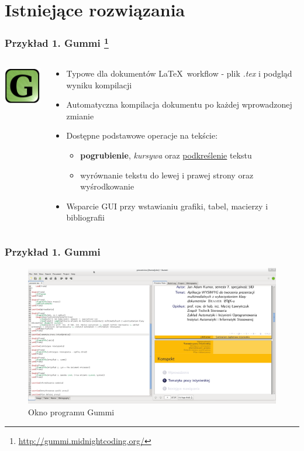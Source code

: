 \documentclass[t]{beamer}
\begin{document}
\section{Istniejące rozwiązania}

\begin{frame}[T]
	\frametitle{Przykład 1. Gummi \footnote{\url{http://gummi.midnightcoding.org/}}}
		\begin{columns}[T]
			\begin{column}{.15\textwidth}
				\includegraphics[width=2cm]{gummi_logo.png}
			\end{column}
			\begin{column}{.85\textwidth}
				\begin{itemize}
					\item Typowe dla dokumentów \LaTeX\ workflow - plik \emph{.tex} i podgląd wyniku kompilacji
					\item Automatyczna kompilacja dokumentu po każdej wprowadzonej zmianie
					\item Dostępne  podstawowe operacje na tekście:
					\begin{itemize}
						\item \textbf{pogrubienie}, \emph{kursywa} oraz \underline{podkreślenie} tekstu
						\item wyrównanie tekstu do lewej i prawej strony oraz wyśrodkowanie
					\end{itemize}
					\item Wsparcie GUI przy wstawianiu grafiki, tabel, macierzy i bibliografii
				\end{itemize}
			\end{column}		
		\end{columns}
\end{frame}

\begin{frame}[T]
	\frametitle{Przykład 1. Gummi}
	\begin{figure}[p]
   	    \centering
		\includegraphics[width=.95\textwidth]{gummi_prtscn.png}
   	    \caption{Okno programu Gummi}
	\end{figure}
\end{frame}
\end{document}
